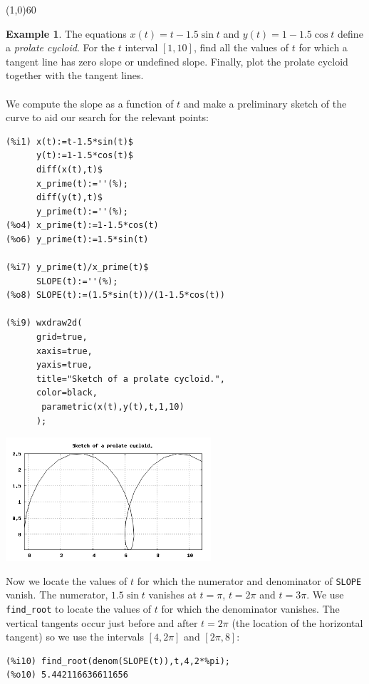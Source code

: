\documentclass[10.5pt,twoside]{report}
\theoremstyle{definition}
\newtheorem{exmp}{Example}[section]
\begin{document}
\line(1,0){60}
\linethickness{0.5mm}


\begin{exmp} The equations $x(t)=t-1.5\sin{t}$ and $y(t)=1-1.5\cos{t}$ define a \textit{prolate cycloid}.  For the $t$ interval $[1,10]$, find all the values of $t$ for which a tangent line has zero slope or undefined slope.  Finally, plot the prolate cycloid together with the tangent lines.\\

${}$\\

We compute the slope as a function of $t$ and make a preliminary sketch of the curve to aid our search for the relevant points:

\begin{verbatim}
(%i1) x(t):=t-1.5*sin(t)$
      y(t):=1-1.5*cos(t)$
      diff(x(t),t)$
      x_prime(t):=''(%);
      diff(y(t),t)$
      y_prime(t):=''(%);
(%o4) x_prime(t):=1-1.5*cos(t)
(%o6) y_prime(t):=1.5*sin(t)

(%i7) y_prime(t)/x_prime(t)$
      SLOPE(t):=''(%);
(%o8) SLOPE(t):=(1.5*sin(t))/(1-1.5*cos(t))

(%i9) wxdraw2d(
      grid=true,
      xaxis=true,
      yaxis=true,
      title="Sketch of a prolate cycloid.",
      color=black,
       parametric(x(t),y(t),t,1,10)
      );
\end{verbatim}

\includegraphics[width=3in]{example_5_2_2_1}

Now we locate the values of $t$ for which the numerator and denominator of \verb|SLOPE| vanish.  The numerator, $1.5\sin{t}$ vanishes at $t=\pi$, $t=2\pi$ and $t=3\pi$.  We use \verb|find_root| to locate the values of $t$ for which the denominator vanishes.  The vertical tangents occur just before and after $t=2\pi$ (the location of the horizontal tangent) so we use the intervals $[4,2\pi]$ and $[2\pi,8]$:

\begin{verbatim}
(%i10) find_root(denom(SLOPE(t)),t,4,2*%pi);
(%o10) 5.442116636611656


\end{verbatim}
\end{exmp}
\end{document}
